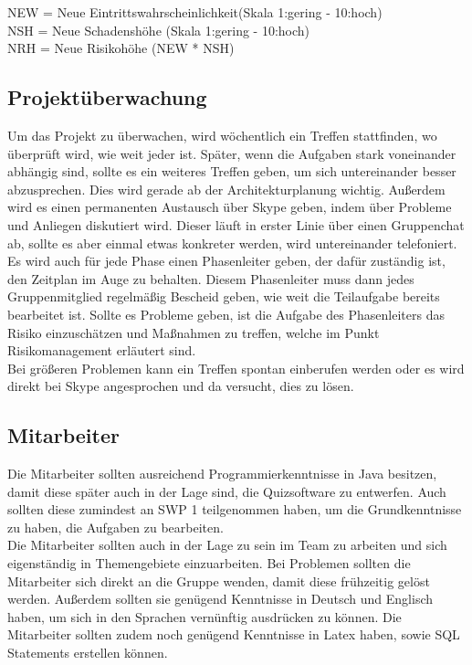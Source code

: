\documentclass[fontsize=12pt,paper=a4,twoside]{scrartcl}
\begin{document}
NEW = Neue Eintrittswahrscheinlichkeit(Skala 1:gering - 10:hoch)\\
NSH = Neue Schadenshöhe (Skala 1:gering - 10:hoch)\\
NRH = Neue Risikohöhe (NEW * NSH)\\


\subsection{Projektüberwachung}\label{3.4-controlling}

Um das Projekt zu überwachen, wird wöchentlich ein Treffen stattfinden, wo überprüft wird, wie weit jeder ist. Später, wenn die Aufgaben stark voneinander abhängig sind, sollte es ein weiteres Treffen geben, um sich untereinander besser abzusprechen. Dies wird gerade ab der Architekturplanung wichtig. Außerdem wird es einen permanenten Austausch über Skype geben, indem über Probleme und Anliegen diskutiert wird. Dieser läuft in erster Linie über einen Gruppenchat ab, sollte es aber einmal etwas konkreter werden, wird untereinander telefoniert. \\
Es wird auch für jede Phase einen Phasenleiter geben, der dafür zuständig ist, den Zeitplan im Auge zu behalten. Diesem Phasenleiter muss dann jedes Gruppenmitglied regelmäßig Bescheid geben, wie weit die Teilaufgabe bereits bearbeitet ist. Sollte es Probleme geben, ist die Aufgabe des Phasenleiters das Risiko einzuschätzen und Maßnahmen zu treffen, welche im Punkt Risikomanagement erläutert sind.\\
Bei größeren Problemen kann ein Treffen spontan einberufen werden oder es wird direkt bei Skype angesprochen und da versucht, dies zu lösen.

\subsection{Mitarbeiter}

Die Mitarbeiter sollten ausreichend Programmierkenntnisse in Java besitzen, damit diese später auch in der Lage sind, die Quizsoftware zu entwerfen. Auch sollten diese zumindest an SWP 1 teilgenommen haben, um die Grundkenntnisse zu haben, die Aufgaben zu bearbeiten. \\
Die Mitarbeiter sollten auch in der Lage zu sein im Team zu arbeiten und sich eigenständig in Themengebiete einzuarbeiten. Bei Problemen sollten die Mitarbeiter sich direkt an die Gruppe wenden, damit diese frühzeitig gelöst werden. Außerdem sollten sie genügend Kenntnisse in Deutsch und Englisch haben, um sich in den Sprachen vernünftig ausdrücken zu können. Die Mitarbeiter sollten zudem noch genügend Kenntnisse in Latex haben, sowie SQL Statements erstellen können. 
\end{document}
